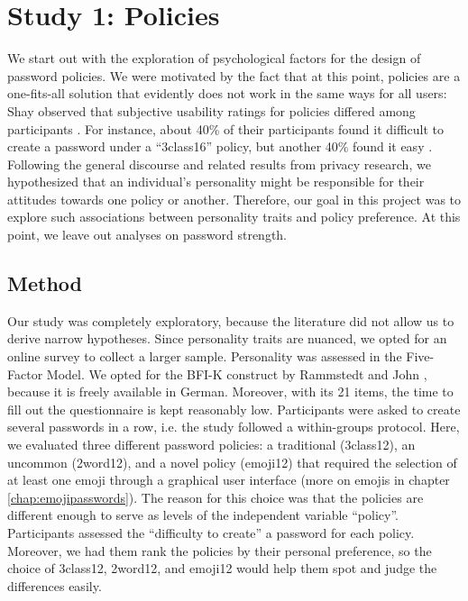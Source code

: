 \section{Study 1: Policies}\label{sec:personality:study-1}
We start out with the exploration of psychological factors for the design of password policies. We were motivated by the fact that at this point, policies are a one-fits-all solution that evidently does not work in the same ways for all users: Shay \etal observed that subjective usability ratings for policies differed among participants \cite{Shay2012CorrectHorseBatteryStaple, Shay2014CanLongPasswordsBeSecureAndUsable}. For instance, about 40\% of their participants found it difficult to create a password under a ``3class16'' policy, but another 40\% found it easy \cite{Shay2014CanLongPasswordsBeSecureAndUsable}. Following the general discourse and related results from privacy research, we hypothesized that an individual's personality might be responsible for their attitudes towards one policy or another. Therefore, our goal in this project was to explore such associations between personality traits and policy preference. At this point, we leave out analyses on password strength.
\subsection{Method}
Our study was completely exploratory, because the literature did not allow us to derive narrow hypotheses. Since personality traits are nuanced, we opted for an online survey to collect a larger sample. Personality was assessed in the Five-Factor Model. We opted for the BFI-K construct by Rammstedt and John \cite{Rammstedt2005BFI}, because it is freely available in German. Moreover, with its 21 items, the time to fill out the questionnaire is kept reasonably low. 
Participants were asked to create several passwords in a row, i.e. the study followed a within-groups protocol. Here, we evaluated three different password policies: a traditional (3class12), an uncommon (2word12), and a novel policy (emoji12) that required the selection of at least one emoji through a graphical user interface (more on emojis in chapter \ref{chap:emojipasswords}). The reason for this choice was that the policies are different enough to serve as levels of the independent variable ``policy''. Participants assessed the ``difficulty to create'' a password for each policy. Moreover, we had them rank the policies by their personal preference, so the choice of 3class12, 2word12, and emoji12 would help them spot and judge the differences easily. 

